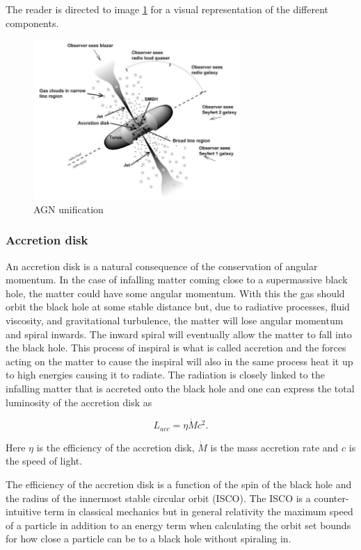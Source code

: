 The reader is directed to image \ref{fig:my_label} for a visual representation of the different components.


\begin{figure}
    \centering
    \includegraphics[width = 0.7\textwidth]{unified model agn.jpg}
    \caption{AGN unification}
    \label{fig:my_label}
\end{figure}

\subsubsection{Accretion disk}
An accretion disk is a natural consequence of the conservation of angular momentum. In the case of infalling 
matter coming close to a supermassive black hole, the matter could have some angular momentum. With this the gas should orbit the black hole at some stable distance but, due to radiative processes, fluid viscosity, and gravitational turbulence, 
the matter will lose angular momentum and spiral inwards. The inward spiral will eventually allow the matter to fall into the black hole. 
This process of inspiral is what is called accretion and the forces acting on the matter to cause the inspiral 
will also in the same process heat it up to high energies causing it to radiate. The radiation is closely linked to the 
infalling matter that is accreted onto the black hole and one can express the total luminosity of the accretion disk as 

\begin{equation}
    L_{acc} = \eta \dot{M}c^2.
    \label{eq:accretion_luminosity}
\end{equation}

Here $\eta$ is the efficiency of the accretion disk, $\dot{M}$ is the mass accretion rate and $c$ is the speed of light.

The efficiency of the accretion disk is a function of the spin of the black hole and the radius of the innermost stable circular orbit (ISCO).
The ISCO is a counter-intuitive term in classical mechanics but in general relativity the maximum speed of a particle 
in addition to an energy term when calculating the orbit set bounds for how close a particle can be to 
a black hole without spiraling in. %

